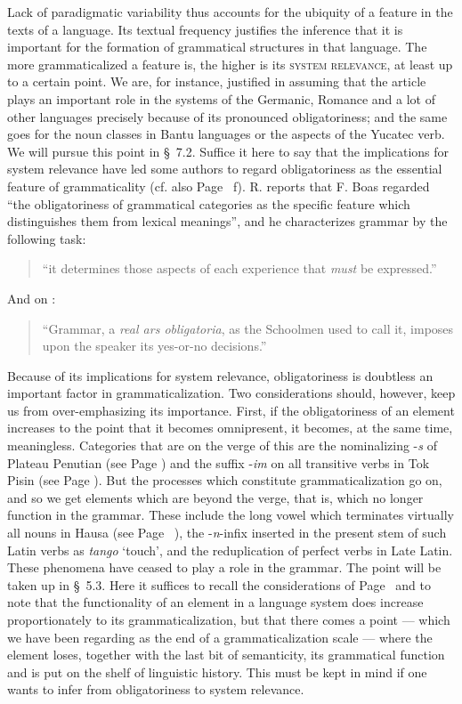 Lack of paradigmatic variability thus accounts for the ubiquity of a feature in the texts of a language. Its textual frequency justifies the inference that it is important for the formation of grammatical structures in that language. The more grammaticalized a feature is, the higher is its \textsc{system relevance}, at least up to a certain point. We are, for instance, justified in assuming that the article plays an important role in the systems of the Germanic, Romance and a lot of other languages precisely because of its pronounced obligatoriness; and the same goes for the noun classes in Bantu languages or the aspects of the Yucatec verb. We will pursue this point in §~7.2. Suffice it here to say that the implications for system relevance have led some authors to regard obligatoriness as the essential feature of grammaticality (cf. also Page~\pageref{page14b}\chk%
f). R. \citet[489]{Jakobson1959} reports that F. Boas regarded “the obligatoriness of grammatical categories as the specific feature which distinguishes them from lexical meanings”, and he characterizes grammar by the following task:

\begin{quote}
“it determines those aspects of each experience that \textit{must} be expressed.”
\end{quote}

\noindent And on \citeyear[492]{Jakobson1959}:
\begin{quote}
“Grammar, a \textit{real ars obligatoria}, as the Schoolmen used to call it, imposes upon the speaker its yes-or-no decisions.”
\end{quote}

\noindent Because of its implications for system relevance, obligatoriness is doubtless an important factor in grammaticalization. Two considerations should, however, keep us from over-emphasizing its importance. First, if the obligatoriness of an element increases to the point that it becomes omnipresent, it becomes, at the same time, meaningless. Categories that are on the verge of this are the nominalizing -\textit{s} of Plateau Penutian (see Page \pageref{PlateauPenutian}) and the suffix -\textit{im} on all transitive verbs in Tok Pisin (see Page \pageref{ex:E11}). But the processes which constitute grammaticalization go on, and so we get elements which are beyond the verge, that is, which no longer function in the grammar. These include the long vowel which terminates virtually all nouns in Hausa (see Page~\pageref{page59}\chk%
), the -\textit{n}{}-infix inserted in the present stem of such Latin verbs as \textit{tango} ‘touch’, and the reduplication of perfect verbs in Late Latin. These phenomena have ceased to play a role in the grammar. The point will be taken up in §~5.3. Here it suffices to recall the considerations of Page~\pageref{page141b}\chk%
 and to note that the functionality of an element in a language system does increase proportionately to its grammaticalization, but that there comes a point — which we have been regarding as the end of a grammaticalization scale — where the element loses, together with the last bit of semanticity, its grammatical function and is put on the shelf of linguistic history. This must be kept in mind if one wants to infer from obligatoriness to system relevance.

